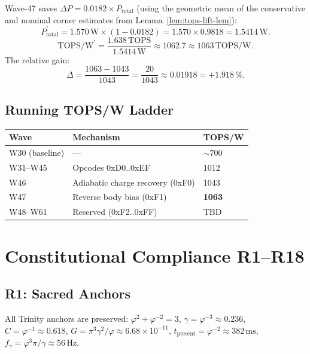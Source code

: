 Wave-47 saves $\Delta P = 0.0182 \times P_{\mathrm{total}}$ (using the
geometric mean of the conservative and nominal corner estimates from
Lemma~\ref{lem:tops-lift-lem}):
\begin{equation}
  P_{\mathrm{total}}^{\prime} = 1.570\,\text{W} \times (1 - 0.0182)
    = 1.570 \times 0.9818 = 1.5414\,\text{W}.
\end{equation}
\begin{equation}
  \text{TOPS/W}^{\prime} = \frac{1.638\,\text{TOPS}}{1.5414\,\text{W}}
    \approx 1062.7 \approx 1063\,\text{TOPS/W}.
\end{equation}
The relative gain:
\begin{equation}
  \Delta = \frac{1063 - 1043}{1043} = \frac{20}{1043} \approx 0.01918 = +1.918\,\%.
\end{equation}

\subsection{Running TOPS/W Ladder}

\begin{center}
\begin{tabular}{lll}
\hline
\textbf{Wave} & \textbf{Mechanism} & \textbf{TOPS/W} \\
\hline
W30 (baseline) & --- & $\sim 700$ \\
W31--W45 & Opcodes 0xD0..0xEF & 1012 \\
W46 & Adiabatic charge recovery (0xF0) & 1043 \\
W47 & Reverse body bias (0xF1) & \textbf{1063} \\
W48--W61 & Reserved (0xF2..0xFF) & TBD \\
\hline
\end{tabular}
\end{center}

\section{Constitutional Compliance R1--R18}
\label{sec:compliance-w47}

\subsection{R1: Sacred Anchors}

All Trinity anchors are preserved:
$\varphi^{2} + \varphi^{-2} = 3$,
$\gamma = \varphi^{-3} \approx 0.236$,
$C = \varphi^{-1} \approx 0.618$,
$G = \pi^{3} \gamma^{2} / \varphi \approx 6.68 \times 10^{-11}$,
$t_{\mathrm{present}} = \varphi^{-2} \approx 382\,\text{ms}$,
$f_\gamma = \varphi^{3} \pi / \gamma \approx 56\,\text{Hz}$.
\checkmark

